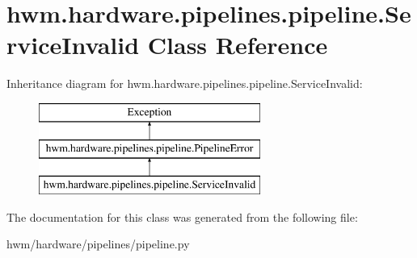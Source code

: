 \hypertarget{classhwm_1_1hardware_1_1pipelines_1_1pipeline_1_1_service_invalid}{\section{hwm.\-hardware.\-pipelines.\-pipeline.\-Service\-Invalid Class Reference}
\label{classhwm_1_1hardware_1_1pipelines_1_1pipeline_1_1_service_invalid}
}
Inheritance diagram for hwm.\-hardware.\-pipelines.\-pipeline.\-Service\-Invalid\-:\begin{figure}[H]
\begin{center}
\leavevmode
\includegraphics[height=3.000000cm]{classhwm_1_1hardware_1_1pipelines_1_1pipeline_1_1_service_invalid}
\end{center}
\end{figure}


The documentation for this class was generated from the following file\-:\begin{DoxyCompactItemize}
\item 
hwm/hardware/pipelines/pipeline.\-py\end{DoxyCompactItemize}
